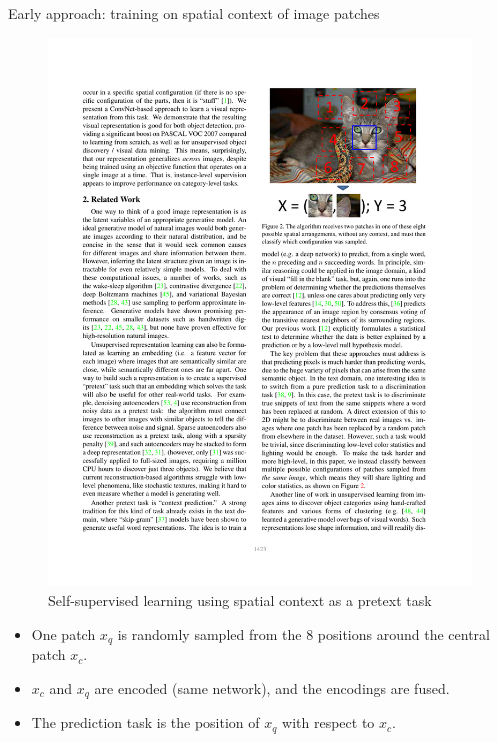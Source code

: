 \documentclass[xcolor=pdftex,dvipsnames,table]{beamer}
\begin{document}
\begin{frame}{Early approach: training on spatial context of image patches}
\begin{figure}[htb]
   \centering
   \includegraphics[height=0.4\textheight]{../graphics/position_learning.pdf}
   \caption{Self-supervised learning using spatial context as a pretext task\cite{Doersch2015}}
\end{figure}
\begin{itemize}
   \item One patch $x_q$ is randomly sampled from the 8 positions around the central patch $x_c$.
   \item $x_c$ and $x_q$ are encoded (same network), and the encodings are fused. 
   \item The prediction task is the position of $x_q$ with respect to $x_c$.
\end{itemize}
\end{frame}
\end{document}
